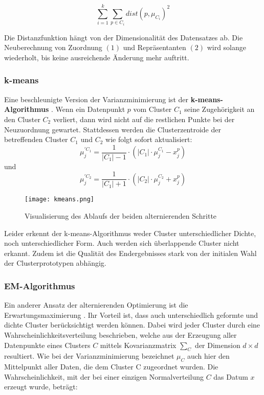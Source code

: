 \documentclass[11pt,fleqn]{book}
\begin{document}
$$\sum_{i=1}^{k}\sum_{p \in C_i}^{} dist(p,\mu_{C_i})^2$$

Die Distanzfunktion hängt von der Dimensionalität des Datensatzes ab. Die Neuberechnung von Zuordnung $(1)$ und Repräsentanten $(2)$ wird solange wiederholt, bis keine ausreichende Änderung mehr auftritt.

\subsubsection{k-means}

Eine beschleunigte Version der Varianzminimierung ist der \textbf{k-means-Algorithmus} \cite{forgy}. Wenn ein Datenpunkt $p$ vom Cluster $C_1$ seine Zugehörigkeit an den Cluster $C_2$ verliert, dann wird nicht auf die restlichen Punkte bei der Neuzuordnung gewartet. Stattdessen werden die Clusterzentroide der betreffenden Cluster $C_1$ und $C_2$ wie folgt sofort aktualisiert:
$$\mu_j^{' C_1} = \frac{1}{|C_1|-1}\cdot(|C_1|\cdot \mu_j^{C_1} - x_j^p)$$ und $$\mu_j^{' C_2} = \frac{1}{|C_1|+1}\cdot(|C_2|\cdot \mu_j^{C_2} + x_j^p)$$ 

\begin{figure}[h]
\centering
\texttt{[image: kmeans.png]}
\caption{Visualisierung des Ablaufs der beiden alternierenden Schritte}\label{cluster}
\end{figure}

Leider erkennt der k-means-Algorithmus weder Cluster unterschiedlicher Dichte, noch unterschiedlicher Form. Auch werden sich überlappende Cluster nicht erkannt. Zudem ist die Qualität des Endergebnisses stark von der initialen Wahl der Clusterprototypen abhängig.

\subsubsection{EM-Algorithmus}
Ein anderer Ansatz der alternierenden Optimierung ist die Erwartungsmaximierung \cite{emalg}. Ihr Vorteil ist, dass auch unterschiedlich geformte und dichte Cluster berücksichtigt werden können. Dabei wird jeder Cluster durch eine Wahrscheinlichkeitsverteilung beschrieben, welche aus der Erzeugung aller Datenpunkte eines Clusters $C$ mittels Kovarianzmatrix $\sum_C$ der Dimension $d \times d$ resultiert. Wie bei der Varianzminimierung bezeichnet $\mu_C$ auch hier den Mittelpunkt aller Daten, die dem Cluster C zugeordnet wurden. Die Wahrscheinlichkeit, mit der bei einer einzigen Normalverteilung $C$ das Datum $x$ erzeugt wurde, beträgt:
\end{document}
